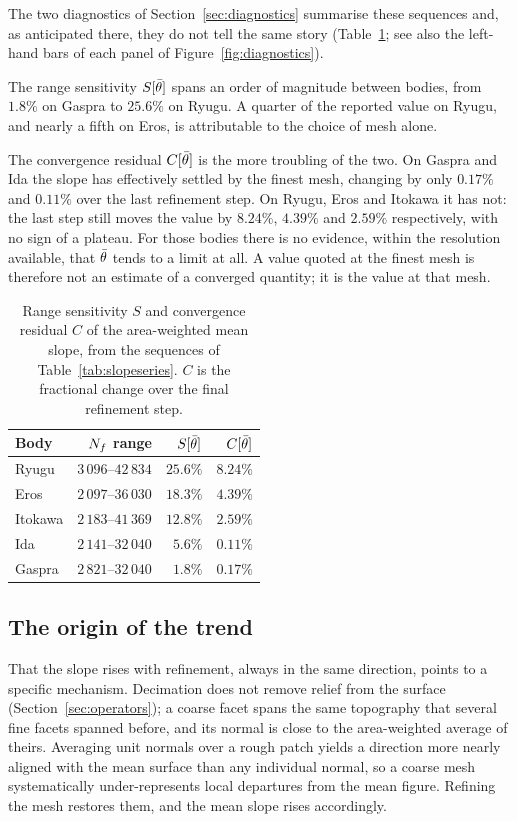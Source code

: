 The two diagnostics of Section~\ref{sec:diagnostics} summarise these sequences
and, as anticipated there, they do not tell the same story
(Table~\ref{tab:slopesens}; see also the left-hand bars of each panel of
Figure~\ref{fig:diagnostics}).

The range sensitivity $S[\bar{\theta}]$ spans an order of magnitude between
bodies, from $1.8\%$ on Gaspra to $25.6\%$ on Ryugu. A quarter of the reported
value on Ryugu, and nearly a fifth on Eros, is attributable to the choice of
mesh alone.

The convergence residual $C[\bar{\theta}]$ is the more troubling of the two. On
Gaspra and Ida the slope has effectively settled by the finest mesh, changing
by only $0.17\%$ and $0.11\%$ over the last refinement step. On Ryugu, Eros and
Itokawa it has not: the last step still moves the value by $8.24\%$, $4.39\%$
and $2.59\%$ respectively, with no sign of a plateau. For those bodies there is
no evidence, within the resolution available, that $\bar{\theta}$ tends to a limit
at all. A value quoted at the finest mesh is therefore not an estimate of a
converged quantity; it is the value at that mesh.

\begin{table}[t]
\centering
\small
\caption{Range sensitivity $S$ and convergence residual $C$ of the
area-weighted mean slope, from the sequences of Table~\ref{tab:slopeseries}.
$C$ is the fractional change over the final refinement step.}
\label{tab:slopesens}
\begin{tabular}{lrrr}
\toprule
Body & $N_{f}$ range & $S[\bar{\theta}]$ & $C[\bar{\theta}]$ \\
\midrule
Ryugu   & $3\,096$--$42\,834$ & $25.6\%$ & $8.24\%$ \\
Eros    & $2\,097$--$36\,030$ & $18.3\%$ & $4.39\%$ \\
Itokawa & $2\,183$--$41\,369$ & $12.8\%$ & $2.59\%$ \\
Ida     & $2\,141$--$32\,040$ & $5.6\%$  & $0.11\%$ \\
Gaspra  & $2\,821$--$32\,040$ & $1.8\%$  & $0.17\%$ \\
\bottomrule
\end{tabular}
\end{table}

\subsection{The origin of the trend}
\label{sec:slopeorigin}

That the slope rises with refinement, always in the same direction, points to a
specific mechanism. Decimation does not remove relief from the surface
(Section~\ref{sec:operators}); a coarse facet spans the same topography that
several fine facets spanned before, and its normal is close to the
area-weighted average of theirs. Averaging unit normals over a rough patch
yields a direction more nearly aligned with the mean surface than any individual
normal, so a coarse mesh systematically under-represents local departures from
the mean figure. Refining the mesh restores them, and the mean slope rises
accordingly.

